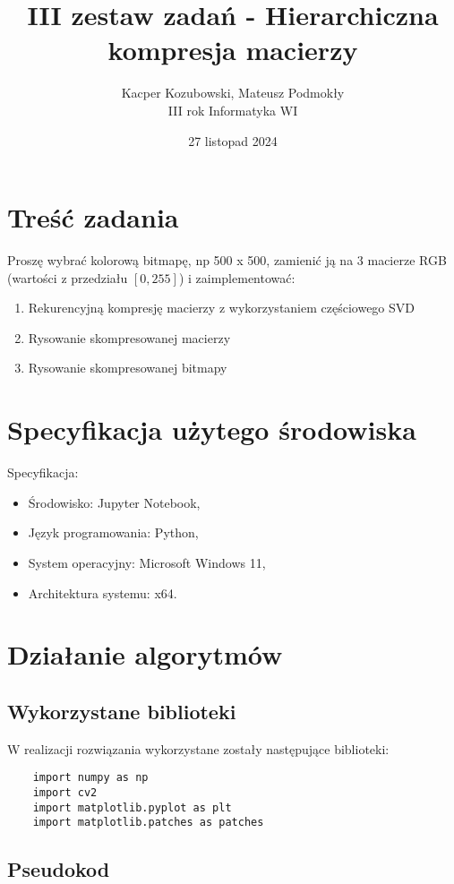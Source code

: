\documentclass[11pt, leqno]{scrartcl}
\title{III zestaw zadań - Hierarchiczna kompresja macierzy}
\author{Kacper Kozubowski, Mateusz Podmokły \\ III
    rok Informatyka WI}
\date{27 listopad 2024}
\begin{document}
    \maketitle
    \section{Treść zadania}
    Proszę wybrać kolorową bitmapę, np 500 x 500, zamienić ją na
    3 macierze RGB (wartości z przedziału $[0,255]$)
    i zaimplementować:
    \begin{enumerate}
        \item Rekurencyjną kompresję macierzy z wykorzystaniem
            częściowego SVD
        \item Rysowanie skompresowanej macierzy
        \item Rysowanie skompresowanej bitmapy
    \end{enumerate}

    \section{Specyfikacja użytego środowiska}
    Specyfikacja:
    \begin{itemize}
        \item Środowisko: Jupyter Notebook,
        \item Język programowania: Python,
        \item System operacyjny: Microsoft Windows 11,
        \item Architektura systemu: x64.
    \end{itemize}

    \section{Działanie algorytmów}
    \subsection{Wykorzystane biblioteki}
    W realizacji rozwiązania wykorzystane zostały następujące
    biblioteki:
    \begin{lstlisting}
    import numpy as np
    import cv2
    import matplotlib.pyplot as plt
    import matplotlib.patches as patches
    \end{lstlisting}

    \subsection{Pseudokod}
    
\end{document}
